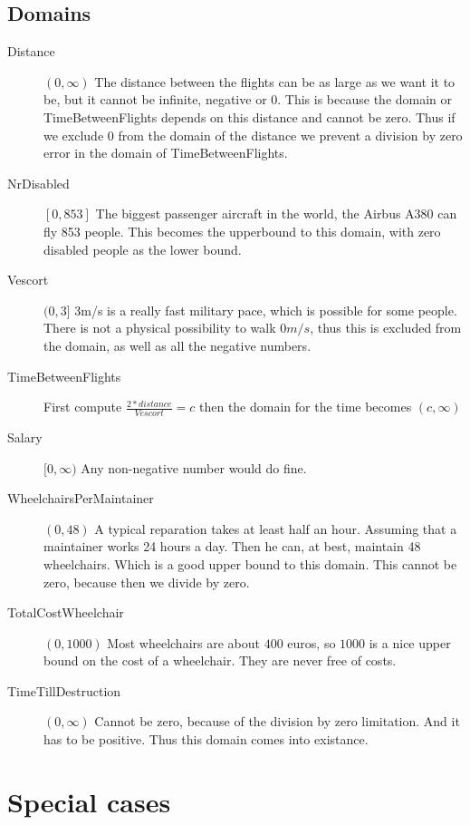 \documentclass[a4paper, 11pt, notitlepage]{report}
\begin{document}
\subsection{Domains}
	\begin{description}
		\item[Distance] $(0,\infty)$ The distance between the flights can be as large as we want it to be, but it cannot be infinite, negative or 0. This is because the domain or TimeBetweenFlights depends on this distance and cannot be zero. Thus if we exclude 0 from the domain of the distance we prevent a division by zero error in the domain of TimeBetweenFlights.
		\item[NrDisabled] $[0,853 ]$ The biggest passenger aircraft in the world, the Airbus A380 can fly 853 people. This becomes the upperbound to this domain, with zero disabled people as the lower bound.   %
		\item[Vescort] $(0,3]$ 3m/s is a really fast military pace, which is possible for some people. There is not a physical possibility to walk $0m/s$, thus this is excluded from the domain, as well as all the negative numbers.
		\item[TimeBetweenFlights] First compute $\frac{2*distance}{Vescort} = c$ then the domain for the time becomes $(c,\infty)$ %
		\item[Salary] $[0,\infty)$ Any non-negative number would do fine.
		\item[WheelchairsPerMaintainer] $(0,48)$ A typical reparation takes at least half an hour. Assuming that a maintainer works 24 hours a day. Then he can, at best, maintain 48 wheelchairs. Which is a good upper bound to this domain. This cannot be zero, because then we divide by zero.
		\item[TotalCostWheelchair] $(0,1000)$ Most wheelchairs are about $400$ euros, so $1000$ is a nice upper bound on the cost of a wheelchair. They are never free of costs. %
		\item[TimeTillDestruction] $(0,\infty)$ Cannot be zero, because of the division by zero limitation. And it has to be positive. Thus this domain comes into existance.
	\end{description}
\section{Special cases}
\end{document}
